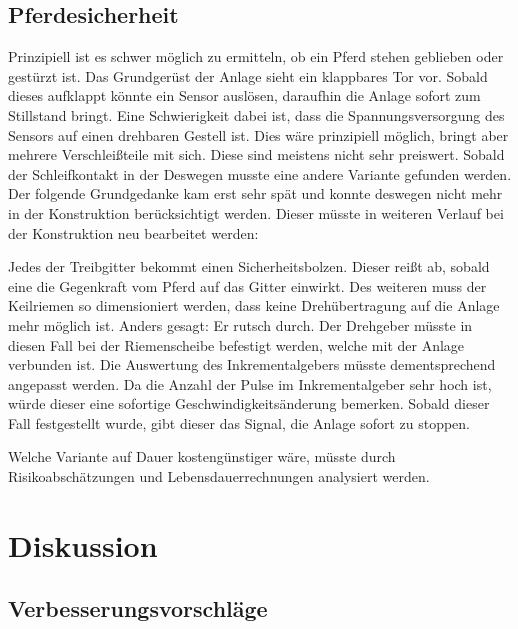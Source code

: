 \subsection{Pferdesicherheit}
\label{sec:pferdesicherheit}

Prinzipiell ist es schwer möglich zu ermitteln, ob ein Pferd stehen geblieben oder gestürzt ist. Das Grundgerüst der Anlage sieht ein klappbares Tor vor. Sobald dieses aufklappt könnte ein Sensor auslösen, daraufhin die Anlage sofort zum Stillstand bringt. Eine Schwierigkeit dabei ist, dass die Spannungsversorgung des Sensors auf einen drehbaren Gestell ist. Dies wäre prinzipiell möglich, bringt aber mehrere Verschleißteile mit sich. Diese sind meistens nicht sehr preiswert. Sobald der Schleifkontakt in der Deswegen musste eine andere Variante gefunden werden. \\
Der folgende Grundgedanke kam erst sehr spät und konnte deswegen nicht mehr in der Konstruktion berücksichtigt werden. Dieser müsste in weiteren Verlauf bei der Konstruktion neu bearbeitet werden:\newline{}

Jedes der Treibgitter bekommt einen Sicherheitsbolzen. Dieser reißt ab, sobald eine die Gegenkraft vom Pferd auf das Gitter einwirkt. Des weiteren muss der Keilriemen so dimensioniert werden, dass keine Drehübertragung auf die Anlage mehr möglich ist. Anders gesagt: Er rutsch durch. Der Drehgeber müsste in diesen Fall bei der Riemenscheibe befestigt werden, welche mit der Anlage verbunden ist. Die Auswertung des Inkrementalgebers müsste dementsprechend angepasst werden. Da die Anzahl der Pulse im Inkrementalgeber sehr hoch ist, würde dieser eine sofortige Geschwindigkeitsänderung bemerken. Sobald dieser Fall festgestellt wurde, gibt dieser das Signal, die Anlage sofort zu stoppen. \newline{}

Welche Variante auf Dauer kostengünstiger wäre, müsste durch Risikoabschätzungen und Lebensdauerrechnungen analysiert werden. 

\newpage

\section{Diskussion}
\label{sec:diskussion}

\subsection{Verbesserungsvorschläge}
\label{sec:verbesserungsvorschläge}

